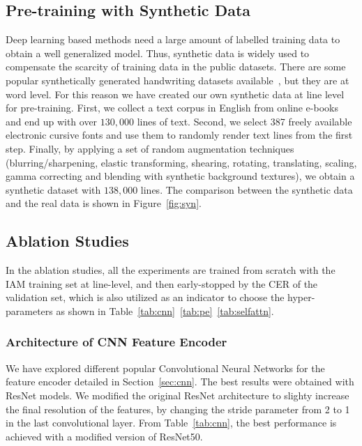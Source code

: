 \documentclass[10pt,twocolumn,letterpaper]{article}
\begin{document}
\subsection{Pre-training with Synthetic Data}
\label{sec:syn}
Deep learning based methods need a large amount of labelled training data to obtain a well generalized model. Thus, synthetic data is widely used to compensate the scarcity of training data in the public datasets. There are some popular synthetically generated handwriting datasets available~\cite{krishnan2016generating,kang2019candidate}, but they are at word level. For this reason we have created our own synthetic data at line level for pre-training. First, we collect a text corpus in English from online e-books and end up with over $130,000$ lines of text. Second, we select 387 freely available electronic cursive fonts and use them to randomly render text lines from the first step. Finally, by applying a set of random augmentation techniques (blurring/sharpening, elastic transforming, shearing, rotating, translating, scaling, gamma correcting and blending with synthetic background textures), we obtain a synthetic dataset with $138,000$ lines. The comparison between the synthetic data and the real data is shown in Figure~\ref{fig:syn}.




\subsection{Ablation Studies}
\label{sec:abla}
In the ablation studies, all the experiments are trained from scratch with the IAM training set at line-level, and then early-stopped by the CER of the validation set, which is also utilized as an indicator to choose the hyper-parameters as shown in Table~\ref{tab:cnn}~\ref{tab:pe}~\ref{tab:selfattn}.



\subsubsection{Architecture of CNN Feature Encoder}
We have explored different popular Convolutional Neural Networks for the feature encoder detailed in Section~\ref{sec:cnn}. The best results were obtained with ResNet models. We modified the original ResNet architecture to slighty increase the final resolution of the features, by changing the stride parameter from 2 to 1 in the last convolutional layer. From Table~\ref{tab:cnn}, the best performance is achieved with a modified version of ResNet50.
\end{document}
